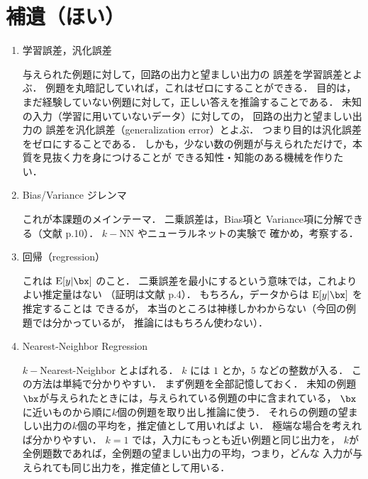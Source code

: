 \documentclass[a4paper,11pt]{jarticle}
\begin{document}
  
\section{補遺（ほい）}
\begin{enumerate}
 \item 学習誤差，汎化誤差
       
      与えられた例題に対して，回路の出力と望ましい出力の
      誤差を学習誤差とよぶ．
      例題を丸暗記していれば，これはゼロにすることができる．
      目的は，まだ経験していない例題に対して，正しい答えを推論することである．
      未知の入力（学習に用いていないデータ）に対しての，
      回路の出力と望ましい出力の
      誤差を汎化誤差（generalization error）とよぶ．
      つまり目的は汎化誤差をゼロにすることである．
      しかも，少ない数の例題が与えられただけで，本質を見抜く力を身につけることが
      できる知性・知能のある機械を作りたい．

 \item Bias/Variance ジレンマ

       これが本課題のメインテーマ．
       二乗誤差は，Bias項と 
       Variance項に分解できる（文献\cite{sgeman92a} p.10）．
       $k-$NN やニューラルネットの実験で
       確かめ，考察する．
       
 \item 回帰（regression）

       これは $ {\rm E }  [y | \bx]   $ のこと．
       二乗誤差を最小にするという意味では，これよりよい推定量はない
       （証明は文献\cite{sgeman92a} p.4）．
       もちろん，データからは $ {\rm E }  [y | \bx]   $ を推定することは
       できるが，
       本当のところは神様しかわからない（今回の例題では分かっているが，
       推論にはもちろん使わない）．
       
 \item Nearest-Neighbor Regression

       $k-$Nearest-Neighbor とよばれる．
       $k$ には $1$ とか，$5$ などの整数が入る．
       この方法は単純で分かりやすい．
       まず例題を全部記憶しておく．
       未知の例題 $\bx$が与えられたときには，与えられている例題の中に含まれている，
       $\bx$に近いものから順に$k$個の例題を取り出し推論に使う．
       それらの例題の望ましい出力の$k$個の平均を，推定値として用いればよ
       い．
       極端な場合を考えれば分かりやすい．
       $k=1$ では，入力にもっとも近い例題と同じ出力を，
       $k$が全例題数であれば，全例題の望ましい出力の平均，つまり，どんな
       入力が与えられても同じ出力を，推定値として用いる．
              

\end{enumerate}
\end{document}
